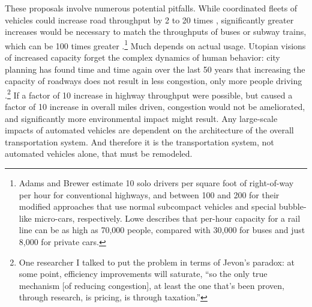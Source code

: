 These proposals involve numerous potential pitfalls. While coordinated
fleets of vehicles could increase road throughput by 2 to 20
times \cite[p. 229]{adamsBrewerRoadways}, significantly greater
increases would be necessary to match the 
throughputs of buses or subway trains, which can be 100 times
greater \cite[p. 222]{loweCars}.\footnote{Adams and Brewer
  estimate 10 solo drivers per square foot of right-of-way per
  hour for conventional highways, and between 100 and 200 for their
  modified approaches that use normal subcompact vehicles and special
  bubble-like micro-cars, respectively. Lowe describes that
  per-hour capacity for 
  a rail line can be as high as 70,000 people, compared with 30,000 for buses
and just 8,000 for private cars.} Much depends on actual usage.
Utopian visions of increased capacity forget the complex dynamics of
human behavior: city planning has found 
time and time again over the last 50 years that increasing the
capacity of roadways does not result in less congestion, only more
people driving \cite[p. 219]{marshallFuture}.\footnote{One researcher I talked
to put the problem in terms of Jevon's paradox: at some point,
efficiency improvements will saturate, ``so the only true mechanism
[of reducing congestion],
at least the one that's been proven, through research, is pricing, is
through taxation.''} If a factor of 10
increase in highway throughput were possible, but caused a factor of
10 increase in overall miles driven, congestion would not be
ameliorated, and significantly more environmental impact might result. Any
large-scale impacts of automated vehicles are dependent on the
architecture of the overall transportation system. And therefore it is
the transportation system, not automated vehicles alone, that must be remodeled.




